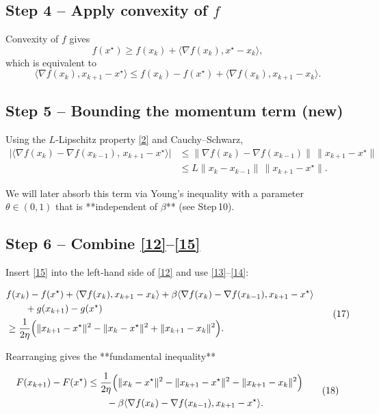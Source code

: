 \documentclass{article}
\begin{document}
\subsection*{Step 4 – Apply convexity of $f$}
Convexity of $f$ gives
\[
f(x^\star)\ge f(x_k)+\langle \nabla f(x_k),x^\star-x_k\rangle,
\]
which is equivalent to
\[
\langle \nabla f(x_k),x_{k+1}-x^\star\rangle
\le f(x_k)-f(x^\star)+\langle \nabla f(x_k),x_{k+1}-x_k\rangle .
\tag{15}
\]

\subsection*{Step 5 – Bounding the momentum term (new)}
Using the $L$‑Lipschitz property \eqref{2} and Cauchy–Schwarz,
\[
\begin{aligned}
\big|\langle \nabla f(x_k)-\nabla f(x_{k-1}),\,x_{k+1}-x^\star\rangle\big|
&\le \|\nabla f(x_k)-\nabla f(x_{k-1})\|\,\|x_{k+1}-x^\star\|\\
&\le L\|x_k-x_{k-1}\|\,\|x_{k+1}-x^\star\|.
\end{aligned}
\tag{16}
\]

We will later absorb this term via Young’s inequality with a parameter $\theta\in(0,1)$ that is **independent of $\beta$** (see Step 10).

\subsection*{Step 6 – Combine \eqref{12}–\eqref{15}}
Insert \eqref{15} into the left‑hand side of \eqref{12} and use \eqref{13}–\eqref{14}:

\[
\begin{aligned}
&f(x_k)-f(x^\star)+\langle \nabla f(x_k),x_{k+1}-x_k\rangle
+ \beta\langle \nabla f(x_k)-\nabla f(x_{k-1}),x_{k+1}-x^\star\rangle \\
&\qquad + g(x_{k+1})-g(x^\star) \\
&\ge \frac{1}{2\eta}\Bigl(\|x_{k+1}-x^\star\|^{2}
-\|x_k-x^\star\|^{2}
+\|x_{k+1}-x_k\|^{2}\Bigr).
\end{aligned}
\tag{17}
\]

Rearranging gives the **fundamental inequality**

\[
\begin{aligned}
F(x_{k+1})-F(x^\star)
&\le \frac{1}{2\eta}\Bigl(\|x_k-x^\star\|^{2}
-\|x_{k+1}-x^\star\|^{2}
-\|x_{k+1}-x_k\|^{2}\Bigr) \\
&\qquad -\beta\langle \nabla f(x_k)-\nabla f(x_{k-1}),x_{k+1}-x^\star\rangle .
\end{aligned}
\tag{18}
\]
\end{document}

